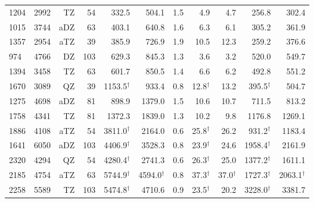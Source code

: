 \begin{table}[H]
\begin{tabular}{lrrrrrrrrrr}
1204& 2992&    TZ&    54&               332.5 &              504.1&     1.5 &                4.9 &                4.7&               256.8&               302.4\\
1015& 3744&   aDZ&    63&               403.1 &              640.8&     1.6 &                6.3 &                6.1&               305.2&               361.9\\
1357& 2954&   aTZ&    39&               385.9 &              726.9&     1.9 &               10.5 &               12.3&               259.2&               376.6\\
 974& 4766&    DZ&   103&               629.3 &              845.3&     1.3 &                3.6 &                3.2&               520.0&               549.7\\
1394& 3458&    TZ&    63&               601.7 &              850.5&     1.4 &                6.6 &                6.2&               492.8&               551.2\\
1670& 3089&    QZ&    39&  1153.5$^{\dagger}$ &              933.4&     0.8 &   12.8$^{\dagger}$ &               13.2&   395.5$^{\dagger}$&               504.7\\
1275& 4698&   aDZ&    81&               898.9 &             1379.0&     1.5 &               10.6 &               10.7&               711.5&               813.2\\
1758& 4341&    TZ&    81&              1372.3 &             1839.0&     1.3 &               10.2 &                9.8&              1176.8&              1269.1\\
1886& 4108&   aTZ&    54&  3811.0$^{\dagger}$ &             2164.0&     0.6 &   25.8$^{\dagger}$ &               26.2&   931.2$^{\dagger}$&              1183.4\\
1641& 6050&   aDZ&   103&  4406.9$^{\dagger}$ &             3528.3&     0.8 &   23.9$^{\dagger}$ &               24.6&  1958.4$^{\dagger}$&              2161.9\\
2320& 4294&    QZ&    54&  4280.4$^{\dagger}$ &             2741.3&     0.6 &   26.3$^{\dagger}$ &               25.0&  1377.2$^{\dagger}$&              1611.1\\
2185& 4754&   aTZ&    63&  5744.9$^{\dagger}$ & 4594.0$^{\dagger}$&     0.8 &   37.3$^{\dagger}$ &   37.0$^{\dagger}$&  1727.3$^{\dagger}$&  2063.1$^{\dagger}$\\
2258& 5589&    TZ&   103&  5474.8$^{\dagger}$ &             4710.6&     0.9 &   23.5$^{\dagger}$ &               20.2&  3228.0$^{\dagger}$&              3381.7\\

\end{tabular}
\end{table}

